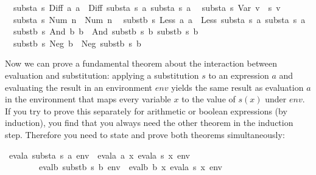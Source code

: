 \begin{isabellebody}
\ \ {\isachardoublequoteopen}substa\ s\ {\isacharparenleft}Diff\ a{}\ a{}{\isacharparenright}\ {\isacharequal}\ Diff\ {\isacharparenleft}substa\ s\ a{}{\isacharparenright}\ {\isacharparenleft}substa\ s\ a{}{\isacharparenright}{\isachardoublequoteclose}\isanewline
\ \ {\isachardoublequoteopen}substa\ s\ {\isacharparenleft}Var\ v{\isacharparenright}\ {\isacharequal}\ s\ v{\isachardoublequoteclose}\isanewline
\ \ {\isachardoublequoteopen}substa\ s\ {\isacharparenleft}Num\ n{\isacharparenright}\ {\isacharequal}\ Num\ n{\isachardoublequoteclose}\isanewline
\isanewline
\ \ {\isachardoublequoteopen}substb\ s\ {\isacharparenleft}Less\ a{}\ a{}{\isacharparenright}\ {\isacharequal}\ Less\ {\isacharparenleft}substa\ s\ a{}{\isacharparenright}\ {\isacharparenleft}substa\ s\ a{}{\isacharparenright}{\isachardoublequoteclose}\isanewline
\ \ {\isachardoublequoteopen}substb\ s\ {\isacharparenleft}And\ b{}\ b{}{\isacharparenright}\ {\isacharequal}\ And\ {\isacharparenleft}substb\ s\ b{}{\isacharparenright}\ {\isacharparenleft}substb\ s\ b{}{\isacharparenright}{\isachardoublequoteclose}\isanewline
\ \ {\isachardoublequoteopen}substb\ s\ {\isacharparenleft}Neg\ b{\isacharparenright}\ {\isacharequal}\ Neg\ {\isacharparenleft}substb\ s\ b{\isacharparenright}{\isachardoublequoteclose}%
\begin{isamarkuptext}%
Now we can prove a fundamental theorem about the interaction between
evaluation and substitution: applying a substitution $s$ to an expression $a$
and evaluating the result in an environment $env$ yields the same result as
evaluation $a$ in the environment that maps every variable $x$ to the value
of $s(x)$ under $env$. If you try to prove this separately for arithmetic or
boolean expressions (by induction), you find that you always need the other
theorem in the induction step. Therefore you need to state and prove both
theorems simultaneously:%
\end{isamarkuptext}%
\isamarkuptrue%
\isamarkupfalse%
\ {\isachardoublequoteopen}evala\ {\isacharparenleft}substa\ s\ a{\isacharparenright}\ env\ {\isacharequal}\ evala\ a\ {\isacharparenleft}{\isasymlambda}x{\isachardot}\ evala\ {\isacharparenleft}s\ x{\isacharparenright}\ env{\isacharparenright}\ {\isasymand}\isanewline
\ \ \ \ \ \ \ \ evalb\ {\isacharparenleft}substb\ s\ b{\isacharparenright}\ env\ {\isacharequal}\ evalb\ b\ {\isacharparenleft}{\isasymlambda}x{\isachardot}\ evala\ {\isacharparenleft}s\ x{\isacharparenright}\ env{\isacharparenright}{\isachardoublequoteclose}\isanewline

\end{isabellebody}
